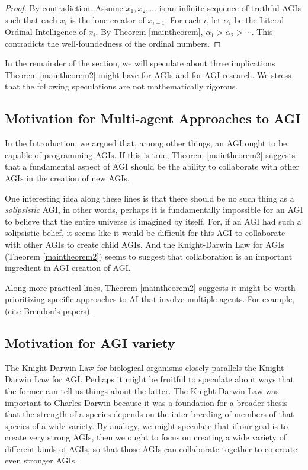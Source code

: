 \documentclass[runningheads]{llncs}
\begin{document}
\begin{proof}
By contradiction. Assume $x_1,x_2,\ldots$ is an infinite sequence of truthful AGIs such
that each $x_i$ is the lone creator of $x_{i+1}$. For each $i$, let $\alpha_i$
be the Literal Ordinal Intelligence of $x_i$. By Theorem \ref{maintheorem},
$\alpha_1>\alpha_2>\cdots$. This contradicts the well-foundedness of the ordinal
numbers.
\end{proof}

In the remainder of the section, we will speculate about three implications
Theorem \ref{maintheorem2} might have for AGIs and for AGI research.
We stress that the following speculations are not mathematically rigorous.

\subsection{Motivation for Multi-agent Approaches to AGI}

In the Introduction, we argued that, among other things, an AGI ought to be
capable of programming AGIs. If this is true, Theorem \ref{maintheorem2} suggests
that a fundamental aspect of AGI should be the ability to collaborate with other
AGIs in the creation of new AGIs.

One interesting idea along these lines is that there should be no
such thing as a \emph{solipsistic} AGI, in other words, perhaps it is
fundamentally impossible for an AGI to believe that the entire universe
is imagined by itself. For, if an AGI had such a solipsistic belief, it
seems like it would be difficult for this AGI to collaborate with other AGIs
to create child AGIs. And the Knight-Darwin Law for AGIs (Theorem \ref{maintheorem2})
seems to suggest that collaboration is an important ingredient in AGI creation of AGI.

Along more practical lines, Theorem \ref{maintheorem2} suggests it might be worth
prioritizing specific approaches to AI that involve multiple agents. For example,
(cite Brendon's papers).

\subsection{Motivation for AGI variety}

The Knight-Darwin Law for biological organisms closely parallels the Knight-Darwin
Law for AGI. Perhaps it might be fruitful to speculate about ways that the former
can tell us things about the latter. The Knight-Darwin Law was important to Charles
Darwin because it was a foundation for a broader thesis that the strength of a
species depends on the inter-breeding of members of that species of a wide variety.
By analogy, we might speculate that if our goal is to create very strong AGIs, then
we ought to focus on creating a wide variety of different kinds of AGIs, so that
those AGIs can collaborate together to co-create even stronger AGIs.
\end{document}
